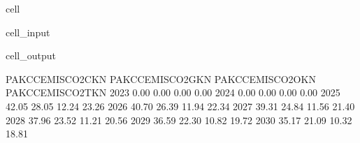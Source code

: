 \documentclass[letterpaper,10pt,english]{jupyterBook}
\begin{document}
\begin{sphinxuseclass}{cell}\begin{sphinxVerbatimInput}

\begin{sphinxuseclass}{cell_input}
\begin{sphinxVerbatim}[commandchars=\\\{\}]
 
    \PYG{p}{[}\PYG{p}{]}
\end{sphinxVerbatim}

\end{sphinxuseclass}\end{sphinxVerbatimInput}
\begin{sphinxVerbatimOutput}

\begin{sphinxuseclass}{cell_output}
\begin{sphinxVerbatim}[commandchars=\\\{\}]
      PAKCCEMISCO2CKN  PAKCCEMISCO2GKN  PAKCCEMISCO2OKN  PAKCCEMISCO2TKN
2023             0.00             0.00             0.00             0.00
2024             0.00             0.00             0.00             0.00
2025           \PYGZhy{}42.05           \PYGZhy{}28.05           \PYGZhy{}12.24           \PYGZhy{}23.26
2026           \PYGZhy{}40.70           \PYGZhy{}26.39           \PYGZhy{}11.94           \PYGZhy{}22.34
2027           \PYGZhy{}39.31           \PYGZhy{}24.84           \PYGZhy{}11.56           \PYGZhy{}21.40
2028           \PYGZhy{}37.96           \PYGZhy{}23.52           \PYGZhy{}11.21           \PYGZhy{}20.56
2029           \PYGZhy{}36.59           \PYGZhy{}22.30           \PYGZhy{}10.82           \PYGZhy{}19.72
2030           \PYGZhy{}35.17           \PYGZhy{}21.09           \PYGZhy{}10.32           \PYGZhy{}18.81
\end{sphinxVerbatim}

\end{sphinxuseclass}\end{sphinxVerbatimOutput}

\end{sphinxuseclass}
\end{document}
